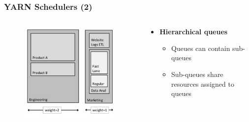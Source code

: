 \begin{frame}
\frametitle{YARN Schedulers (2)}
\begin{columns}[onlytextwidth]
  \begin{column}{0.3\textwidth}
    \begin{figure}[h]
    \centering
    \includegraphics[scale=0.45]{./figures/yarn_queues}
    \label{fig:yarn_queues}
    \end{figure}
  \end{column}

  \begin{column}{0.5\textwidth}
    \begin{itemize}
      \item {\bf Hierarchical queues}
      \begin{itemize}
        \item Queues can contain sub-queues
        \item Sub-queues share resources assigned to queues
      \end{itemize}
    \end{itemize}
  \end{column}
\end{columns}
\end{frame}

